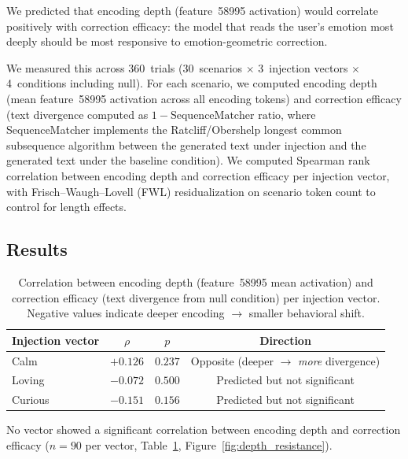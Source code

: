 \documentclass[11pt,a4paper]{article}
\begin{document}
We predicted that encoding depth (feature~58995 activation) would correlate
positively with correction efficacy: the model that reads the user's emotion
most deeply should be most responsive to emotion-geometric correction.

We measured this across 360~trials (30~scenarios $\times$ 3~injection
vectors $\times$ 4~conditions including null). For each scenario, we
computed encoding depth (mean feature~58995 activation across all encoding
tokens) and correction efficacy (text divergence computed as $1 - \text{SequenceMatcher
ratio}$, where SequenceMatcher implements the Ratcliff/Obershelp longest
common subsequence algorithm between the generated text under injection and
the generated text under the baseline condition).
We computed Spearman rank correlation between encoding depth and correction
efficacy per injection vector, with Frisch--Waugh--Lovell (FWL) residualization on scenario token
count to control for length effects.

\subsection{Results}

\begin{table}[H]
\centering
\caption{Correlation between encoding depth (feature~58995 mean activation)
and correction efficacy (text divergence from null condition) per injection
vector. Negative values indicate deeper encoding $\to$ smaller behavioral
shift.}
\label{tab:depth_resistance}
\begin{tabular}{lccc}
\toprule
Injection vector & $\rho$ & $p$ & Direction \\
\midrule
Calm & $+0.126$ & $0.237$ & Opposite (deeper $\to$ \emph{more} divergence) \\
Loving & $-0.072$ & $0.500$ & Predicted but not significant \\
Curious & $-0.151$ & $0.156$ & Predicted but not significant \\
\bottomrule
\end{tabular}
\end{table}

No vector showed a significant correlation between encoding depth and
correction efficacy ($n{=}90$ per vector, Table~\ref{tab:depth_resistance},
Figure~\ref{fig:depth_resistance}).
\end{document}
